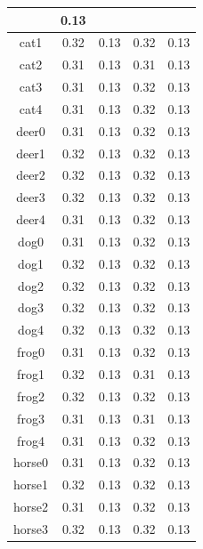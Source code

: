 \begin{longtable} {| c | c | c | c | c |}
& 0.13\\
 \hline
cat1 	\cellcolor{light-gray}	
& 0.32	
& 0.13
& 0.32	
& 0.13\\
 \hline
cat2 	\cellcolor{light-gray}	
& 0.31	
& 0.13
& 0.31 	
& 0.13\\
 \hline
cat3 	\cellcolor{light-gray}	
& 0.31	
& 0.13
& 0.32 	
& 0.13\\
 \hline
cat4 	\cellcolor{light-gray}	
& 0.31	
& 0.13
& 0.32 	
& 0.13\\
 \hline
deer0\cellcolor{light-gray} 	
& 0.31	
& 0.13
& 0.32 	
& 0.13\\
 \hline
deer1\cellcolor{light-gray} 	
& 0.32	
& 0.13
& 0.32 	
& 0.13\\
 \hline
deer2\cellcolor{light-gray} 	
& 0.32	
& 0.13
& 0.32 	
& 0.13\\
 \hline
deer3\cellcolor{light-gray} 			
& 0.32	
& 0.13
& 0.32	
& 0.13\\
 \hline
deer4\cellcolor{light-gray} 	
& 0.31	
& 0.13
& 0.32 	
& 0.13\\
 \hline
dog0 \cellcolor{light-gray}	
& 0.31	
& 0.13
& 0.32	
& 0.13\\
 \hline
dog1 \cellcolor{light-gray}	
& 0.32	
& 0.13
& 0.32 	
& 0.13\\
 \hline
dog2 \cellcolor{light-gray}	
& 0.32	
& 0.13
& 0.32 	
& 0.13\\
 \hline
dog3 \cellcolor{light-gray}	
& 0.32	
& 0.13
& 0.32 	
& 0.13\\
 \hline
dog4 \cellcolor{light-gray}	
& 0.32	
& 0.13
& 0.32 	
& 0.13\\
 \hline
frog0 \cellcolor{light-gray}	
& 0.31	
& 0.13
& 0.32 	
& 0.13\\
 \hline
frog1 \cellcolor{light-gray}	
& 0.32	
& 0.13
& 0.31 	
& 0.13\\
 \hline
frog2 \cellcolor{light-gray}	
& 0.32	
& 0.13
& 0.32 	
& 0.13\\
 \hline
frog3 \cellcolor{light-gray}	
& 0.31	
& 0.13
& 0.31 	
& 0.13\\
 \hline
frog4 \cellcolor{light-gray}	
& 0.31	
& 0.13
& 0.32 	
& 0.13\\
 \hline
horse0 \cellcolor{light-gray} 	
& 0.31	
& 0.13
& 0.32 	
& 0.13\\
 \hline
horse1 \cellcolor{light-gray}	
& 0.32	
& 0.13
& 0.32	
& 0.13\\
 \hline
horse2 \cellcolor{light-gray}	
& 0.31	
& 0.13
& 0.32 	
& 0.13\\
 \hline
horse3 \cellcolor{light-gray}	
& 0.32	
& 0.13
& 0.32 	
& 0.13\\

\end{longtable}

